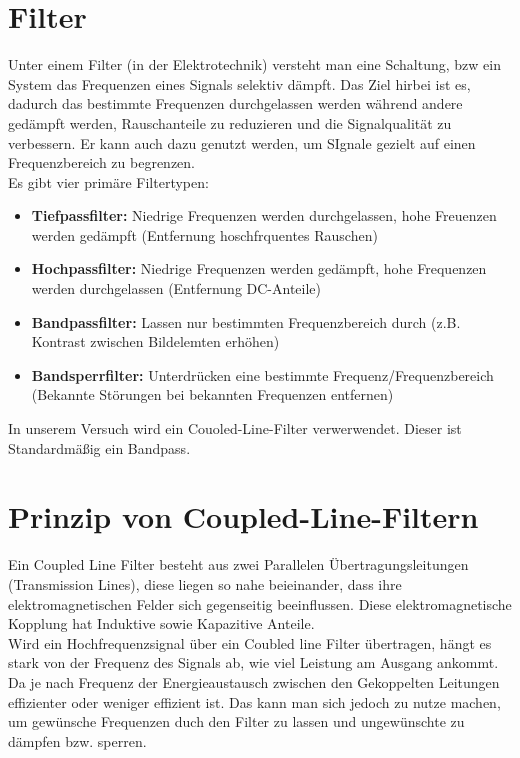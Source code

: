 \section{Filter}
Unter einem Filter (in der Elektrotechnik) versteht man eine Schaltung, bzw ein System das Frequenzen eines Signals selektiv dämpft.
Das Ziel hirbei ist es, dadurch das bestimmte Frequenzen durchgelassen werden während andere gedämpft werden, Rauschanteile
zu reduzieren und die Signalqualität zu verbessern. Er kann auch dazu genutzt werden, um SIgnale gezielt auf einen Frequenzbereich
zu begrenzen.
\\Es gibt vier primäre Filtertypen:
\begin{itemize}
    \item \textbf{Tiefpassfilter:} Niedrige Frequenzen werden durchgelassen, hohe Freuenzen werden gedämpft (Entfernung hoschfrquentes Rauschen)
    \item \textbf{Hochpassfilter:} Niedrige Frequenzen werden gedämpft, hohe Frequenzen werden durchgelassen (Entfernung DC-Anteile)
    \item \textbf{Bandpassfilter:} Lassen nur bestimmten Frequenzbereich durch (z.B. Kontrast zwischen Bildelemten erhöhen)
    \item \textbf{Bandsperrfilter:} Unterdrücken eine bestimmte Frequenz/Frequenzbereich (Bekannte Störungen bei bekannten Frequenzen entfernen)
\end{itemize}

In unserem Versuch wird ein Couoled-Line-Filter verwerwendet. Dieser ist Standardmäßig ein Bandpass.

\section{Prinzip von Coupled-Line-Filtern}
Ein Coupled Line Filter besteht aus zwei Parallelen Übertragungsleitungen (Transmission Lines), 
diese liegen so nahe beieinander, dass ihre elektromagnetischen Felder sich gegenseitig beeinflussen.
Diese elektromagnetische Kopplung hat Induktive sowie Kapazitive Anteile.
\\
Wird ein Hochfrequenzsignal über ein Coubled line Filter übertragen, hängt es stark
von der Frequenz des Signals ab, wie viel Leistung am Ausgang ankommt.
Da je nach Frequenz der Energieaustausch zwischen den Gekoppelten Leitungen effizienter oder weniger effizient ist.
Das kann man sich jedoch zu nutze machen, um gewünsche Frequenzen duch den Filter zu lassen und ungewünschte zu dämpfen bzw. sperren.


